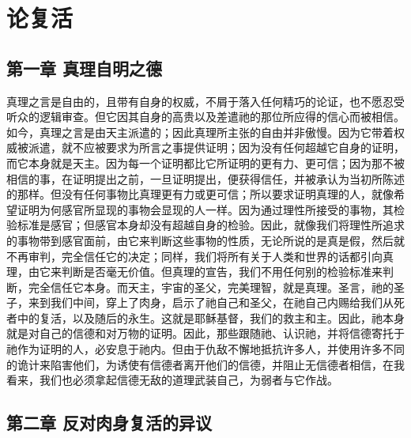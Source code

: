 
\chapter{论复活}



\section{第一章 真理自明之德}

真理之言是自由的，且带有自身的权威，不屑于落入任何精巧的论证，也不愿忍受听众的逻辑审查。但它因其自身的高贵以及差遣祂的那位所应得的信心而被相信。如今，真理之言是由天主派遣的；因此真理所主张的自由并非傲慢。因为它带着权威被派遣，就不应被要求为所言之事提供证明；因为没有任何超越它自身的证明，而它本身就是天主。因为每一个证明都比它所证明的更有力、更可信；因为那不被相信的事，在证明提出之前，一旦证明提出，便获得信任，并被承认为当初所陈述的那样。但没有任何事物比真理更有力或更可信；所以要求证明真理的人，就像希望证明为何感官所显现的事物会显现的人一样。因为通过理性所接受的事物，其检验标准是感官；但感官本身却没有超越自身的检验。因此，就像我们将理性所追求的事物带到感官面前，由它来判断这些事物的性质，无论所说的是真是假，然后就不再审判，完全信任它的决定；同样，我们将所有关于人类和世界的话都引向真理，由它来判断是否毫无价值。但真理的宣告，我们不用任何别的检验标准来判断，完全信任它本身。而天主，宇宙的圣父，完美理智，就是真理。圣言，祂的圣子，来到我们中间，穿上了肉身，启示了祂自己和圣父，在祂自己内赐给我们从死者中的复活，以及随后的永生。这就是耶稣基督，我们的救主和主。因此，祂本身就是对自己的信德和对万物的证明。因此，那些跟随祂、认识祂，并将信德寄托于祂作为证明的人，必安息于祂内。但由于仇敌不懈地抵抗许多人，并使用许多不同的诡计来陷害他们，为诱使有信德者离开他们的信德，并阻止无信德者相信，在我看来，我们也必须拿起信德无敌的道理武装自己，为弱者与它作战。\par


\section{第二章 反对肉身复活的异议}

